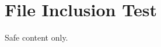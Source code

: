 \documentclass{article}
\begin{document}
\section{File Inclusion Test}
% 
% 
Safe content only.
\end{document}
